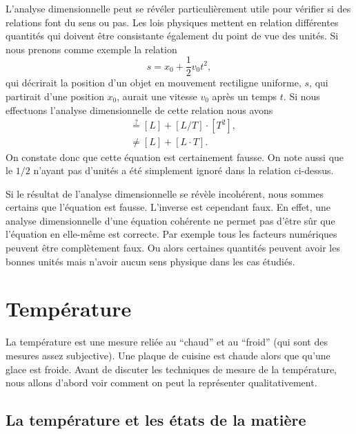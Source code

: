 \documentclass[a4paper,12pt]{book}
\begin{document}
L'analyse dimensionnelle peut se révéler particulièrement utile pour vérifier si des relations font du sens ou pas. Les lois physiques
mettent en relation différentes quantités qui doivent être consistante également du point de vue des unités.
Si nous prenons comme exemple la relation
\begin{equation}
 s=x_0+\frac{1}{2}v_0 t^2,
\end{equation}
qui décrirait la position d'un objet en mouvement rectiligne uniforme, $s$, qui partirait d'une position $x_0$,
aurait une vitesse $v_0$ après un temps $t$. Si nous effectuons l'analyse dimensionnelle de cette relation nous avons
\begin{align}
 [L]&\stackrel{?}{=}[L]+[L/T]\cdot [T^2],\nonumber\\
 &\neq[L]+[L\cdot T].
\end{align}
On constate donc que cette équation est certainement fausse. On note aussi que le $1/2$ n'ayant pas d'unités a été simplement ignoré dans la relation ci-dessus.

Si le résultat de l'analyse dimensionnelle se révèle incohérent, nous sommes certains que l'équation est fausse. 
L'inverse est cependant faux. En effet, une analyse dimensionnelle d'une équation cohérente ne permet pas d'être sûr que l'équation en elle-même est correcte. 
Par exemple tous les facteurs numériques peuvent être complètement faux. Ou alors certaines quantités peuvent avoir les bonnes unités mais n'avoir aucun sens physique dans
les cas étudiés.

\chapter{Température}

La température est une mesure reliée au ``chaud'' et au ``froid'' (qui sont des mesures assez subjective). Une plaque de cuisine est chaude alors que 
qu'une glace est froide. Avant de discuter les techniques de mesure de la température, nous allons d'abord voir comment on peut la représenter qualitativement.

\section{La température et les états de la matière}
\end{document}
